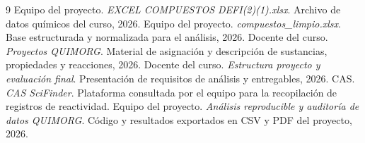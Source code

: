 \begin{thebibliography}{9}
 Equipo del proyecto. \emph{EXCEL COMPUESTOS DEFI(2)(1).xlsx}. Archivo de datos químicos del curso, 2026.
 Equipo del proyecto. \emph{compuestos\_limpio.xlsx}. Base estructurada y normalizada para el análisis, 2026.
 Docente del curso. \emph{Proyectos QUIMORG}. Material de asignación y descripción de sustancias, propiedades y reacciones, 2026.
 Docente del curso. \emph{Estructura proyecto y evaluación final}. Presentación de requisitos de análisis y entregables, 2026.
 CAS. \emph{CAS SciFinder}. Plataforma consultada por el equipo para la recopilación de registros de reactividad.
 Equipo del proyecto. \emph{Análisis reproducible y auditoría de datos QUIMORG}. Código y resultados exportados en CSV y PDF del proyecto, 2026.
\end{thebibliography}
